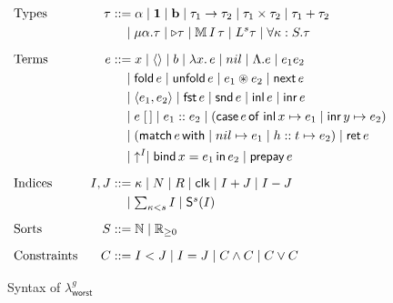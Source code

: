 \begin{figure}[!htbp]
  \centering
  \begin{align*}
    &\text{Types}
    &\tau &::=
      \alpha \mid \mathbf{1} \mid \mathbf{b}
      \mid \tau_1 \to \tau_2
      \mid \tau_1 \times \tau_2
      \mid \tau_1 + \tau_2 \\
    &&&\quad
      \mid \mu\alpha.\tau
      \mid \triangleright \tau
      \mid \mathbb{M}\,{I}\, \tau
      \mid L^s \tau
      \mid \forall\kappa:S.\tau
      \\[6pt]
    &\text{Terms}
    &e &::=
      x \mid \langle\rangle \mid b
      \mid \lambda x.\,e
      \mid nil \mid \Lambda.e
      \mid e_1 e_2 \\
    &&&\quad
      \mid \mathsf{fold}\, e \mid \mathsf{unfold}\, e
      \mid e_1 \circledast e_2
      \mid \mathsf{next}\, e \\
    &&&\quad
      \mid \langle e_1, e_2\rangle
      \mid \mathsf{fst}\,e
      \mid \mathsf{snd}\,e
      \mid \mathsf{inl}\,e
      \mid \mathsf{inr}\,e \\
    &&&\quad
      \mid e\;[\,]
      \mid e_1::e_2
      \mid (\mathsf{case}\,e\,\mathsf{of}\; \mathsf{inl}\,x\mapsto e_1\mid\mathsf{inr}\,y\mapsto e_2) \\
    &&&\quad
      \mid (\mathsf{match}\,e\,\mathsf{with} \mid nil\mapsto e_1\mid h::t\mapsto e_2)
      \mid \mathsf{ret}\, e \\
      &&&\quad
      \mid \;\uparrow^{I}
      \mid \mathsf{bind}\, x= e_1 \, \mathsf{in}\, e_2
      \mid \mathsf{prepay}\, e
      \\[6pt]
    &\text{Indices}
    &I,J &::=
      \kappa \mid N \mid R \mid \mathsf{clk}
      \mid I+J \mid I-J \\
    &&&\quad
      \mid \textstyle\sum_{\kappa<s} I
      \mid \mathsf{S}^s(I)
      \\[6pt]
    &\text{Sorts}
    &S &::=
      \mathbb{N} \mid \mathbb{R}_{\ge 0}
      \\[6pt]
    &\text{Constraints}
    &C &::=
      I < J \mid I = J \mid C \land C \mid C \lor C
  \end{align*}
  \caption{Syntax of $\lambda^g_{\mathsf{worst}}$}
  \label{def:worst-case-syntax}
\end{figure}

